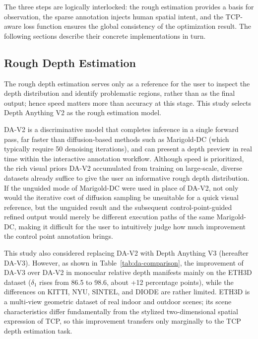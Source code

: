 The three steps are logically interlocked:
the rough estimation provides a basis for observation, the sparse annotation injects human spatial intent,
and the TCP-aware loss function ensures the global consistency of the optimization result.
The following sections describe their concrete implementations in turn.

\subsection{Rough Depth Estimation}
\label{subsec:rough}

The rough depth estimation serves only as a reference for the user to inspect the depth distribution and identify problematic regions,
rather than as the final output; hence speed matters more than accuracy at this stage.
This study selects Depth Anything V2 \cite{depthanythingv2} as the rough estimation model.

DA-V2 is a discriminative model that completes inference in a single forward pass,
far faster than diffusion-based methods such as Marigold-DC (which typically require 50 denoising iterations),
and can present a depth preview in real time within the interactive annotation workflow.
Although speed is prioritized, the rich visual priors DA-V2 accumulated from training on large-scale, diverse datasets
already suffice to give the user an informative rough depth distribution.
If the unguided mode of Marigold-DC were used in place of DA-V2,
not only would the iterative cost of diffusion sampling be unsuitable for a quick visual reference,
but the unguided result and the subsequent control-point-guided refined output would merely be different execution paths of the same Marigold-DC,
making it difficult for the user to intuitively judge how much improvement the control point annotation brings.

This study also considered replacing DA-V2 with Depth Anything V3 \cite{depthanything} (hereafter DA-V3).
However, as shown in Table~\ref{tab:da-comparison},
the improvement of DA-V3 over DA-V2 in monocular relative depth manifests mainly on the ETH3D dataset
($\delta_1$ rises from 86.5 to 98.6, about +12 percentage points),
while the differences on KITTI, NYU, SINTEL, and DIODE are rather limited.
ETH3D is a multi-view geometric dataset of real indoor and outdoor scenes;
its scene characteristics differ fundamentally from the stylized two-dimensional spatial expression of TCP,
so this improvement transfers only marginally to the TCP depth estimation task.

